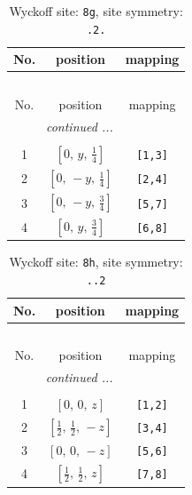 \documentclass[fleqn,8pt]{jsarticle}
\begin{document}
\renewcommand{\arraystretch}{1.2}
\begin{longtable}{ccc}
\caption{Wyckoff site: {\tt 8g}, site symmetry: {\tt .2.}}
 \\
 \hline \hline
No. & position & mapping \\ \hline \endfirsthead

\multicolumn{2}{l}{\tablename\ \thetable{}} \\
 \hline \hline
No. & position & mapping \\ \hline \endhead

 \hline \hline
\multicolumn{2}{r}{\footnotesize\it continued ...} \\ \endfoot

 \hline \hline
\multicolumn{2}{r}{} \\ \endlastfoot

1 & $\left[ 0,\, y,\, \frac{1}{4} \right]$ & {\tt [1,3]} \\ \hline
2 & $\left[ 0,\, - y,\, \frac{1}{4} \right]$ & {\tt [2,4]} \\ \hline
3 & $\left[ 0,\, - y,\, \frac{3}{4} \right]$ & {\tt [5,7]} \\ \hline
4 & $\left[ 0,\, y,\, \frac{3}{4} \right]$ & {\tt [6,8]} \\
\end{longtable}
\renewcommand{\arraystretch}{1.2}
\begin{longtable}{ccc}
\caption{Wyckoff site: {\tt 8h}, site symmetry: {\tt ..2}}
 \\
 \hline \hline
No. & position & mapping \\ \hline \endfirsthead

\multicolumn{2}{l}{\tablename\ \thetable{}} \\
 \hline \hline
No. & position & mapping \\ \hline \endhead

 \hline \hline
\multicolumn{2}{r}{\footnotesize\it continued ...} \\ \endfoot

 \hline \hline
\multicolumn{2}{r}{} \\ \endlastfoot

1 & $\left[ 0,\, 0,\, z \right]$ & {\tt [1,2]} \\ \hline
2 & $\left[ \frac{1}{2},\, \frac{1}{2},\, - z \right]$ & {\tt [3,4]} \\ \hline
3 & $\left[ 0,\, 0,\, - z \right]$ & {\tt [5,6]} \\ \hline
4 & $\left[ \frac{1}{2},\, \frac{1}{2},\, z \right]$ & {\tt [7,8]} \\
\end{longtable}
\end{document}
